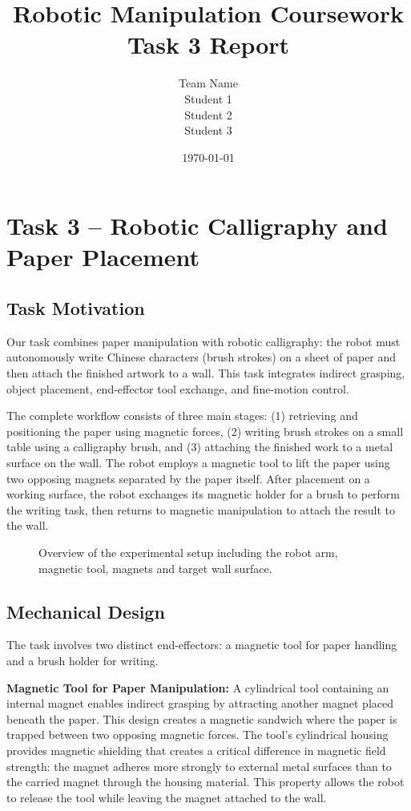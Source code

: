 \documentclass[11pt]{article}
\title{Robotic Manipulation Coursework \\ Task 3 Report}
\author{Team Name \\ Student 1 \\ Student 2 \\ Student 3}
\date{\today}
\begin{document}
\maketitle

\section{Task 3 – Robotic Calligraphy and Paper Placement}

\subsection{Task Motivation}

Our task combines paper manipulation with robotic calligraphy: the robot must autonomously write Chinese characters (brush strokes) on a sheet of paper and then attach the finished artwork to a wall. This task integrates indirect grasping, object placement, end-effector tool exchange, and fine-motion control.

The complete workflow consists of three main stages: (1) retrieving and positioning the paper using magnetic forces, (2) writing brush strokes on a small table using a calligraphy brush, and (3) attaching the finished work to a metal surface on the wall. The robot employs a magnetic tool to lift the paper using two opposing magnets separated by the paper itself. After placement on a working surface, the robot exchanges its magnetic holder for a brush to perform the writing task, then returns to magnetic manipulation to attach the result to the wall.

\begin{figure}[H]
\centering
\fbox{\rule{0pt}{5cm}\rule{10cm}{0pt}}
\caption{Overview of the experimental setup including the robot arm, magnetic tool, magnets and target wall surface.}
\end{figure}

\subsection{Mechanical Design}

The task involves two distinct end-effectors: a magnetic tool for paper handling and a brush holder for writing.

\textbf{Magnetic Tool for Paper Manipulation:} A cylindrical tool containing an internal magnet enables indirect grasping by attracting another magnet placed beneath the paper. This design creates a magnetic sandwich where the paper is trapped between two opposing magnetic forces. The tool's cylindrical housing provides magnetic shielding that creates a critical difference in magnetic field strength: the magnet adheres more strongly to external metal surfaces than to the carried magnet through the housing material. This property allows the robot to release the tool while leaving the magnet attached to the wall.
\end{document}
